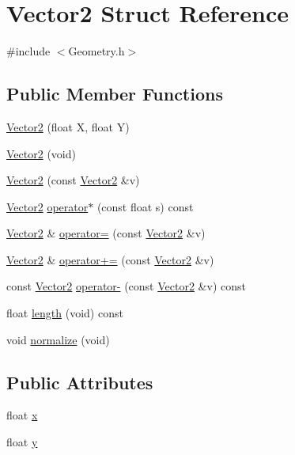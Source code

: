 \hypertarget{struct_vector2}{
\section{Vector2 Struct Reference}
\label{struct_vector2}
}


{\ttfamily \#include $<$Geometry.h$>$}

\subsection*{Public Member Functions}
\begin{DoxyCompactItemize}
\item 
\hyperlink{struct_vector2_a6cb994a033ee0ce6a9d607b27ec2dc42}{Vector2} (float X, float Y)
\item 
\hyperlink{struct_vector2_a90387a46b53d8cbcef993134c2d03245}{Vector2} (void)
\item 
\hyperlink{struct_vector2_a299d9e1cd67d3fb587f57170afab9741}{Vector2} (const \hyperlink{struct_vector2}{Vector2} \&v)
\item 
\hyperlink{struct_vector2}{Vector2} \hyperlink{struct_vector2_a3ff7b554e70e94ebc154664d7722e824}{operator$\ast$} (const float s) const 
\item 
\hyperlink{struct_vector2}{Vector2} \& \hyperlink{struct_vector2_a1df081c36e002f10ac92c957c6731065}{operator=} (const \hyperlink{struct_vector2}{Vector2} \&v)
\item 
\hyperlink{struct_vector2}{Vector2} \& \hyperlink{struct_vector2_a4aa43747680ca286b4e274c8d85478d5}{operator+=} (const \hyperlink{struct_vector2}{Vector2} \&v)
\item 
const \hyperlink{struct_vector2}{Vector2} \hyperlink{struct_vector2_a4696e053ead3dee114538718405ccf7a}{operator-\/} (const \hyperlink{struct_vector2}{Vector2} \&v) const 
\item 
float \hyperlink{struct_vector2_a8676f92084a7c96b02269f9692f9d8bc}{length} (void) const 
\item 
void \hyperlink{struct_vector2_ac6def9fbefb3e48ee2e854d6ce0ff140}{normalize} (void)
\end{DoxyCompactItemize}
\subsection*{Public Attributes}
\begin{DoxyCompactItemize}
\item 
float \hyperlink{struct_vector2_a046bb8d17a876acc49415128dc0502f2}{x}
\item 
float \hyperlink{struct_vector2_a0e07bad05f01ed811b909a2eef97f9e2}{y}
\end{DoxyCompactItemize}


